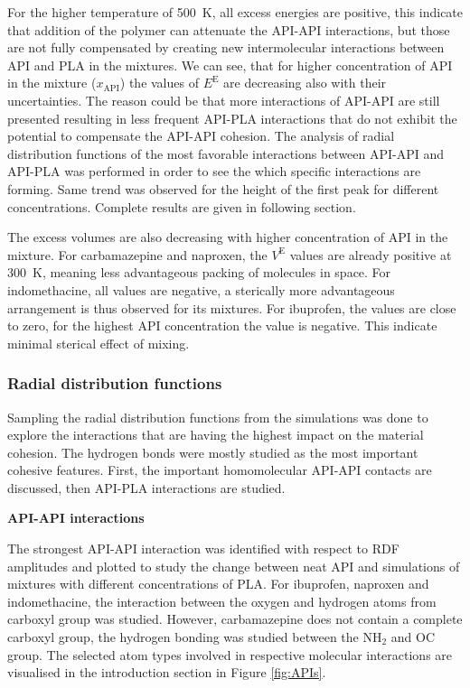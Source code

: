 \newpage
For the higher temperature of 500~K, all excess energies are positive, this indicate that addition of the polymer can attenuate the API-API interactions, but those are not fully compensated by creating new intermolecular interactions between API and PLA in the mixtures. We can see, that for higher concentration of API in the mixture ($x_{\text{API}}$) the values of $E^\text{E}$ are decreasing also with their uncertainties. The reason could be that more interactions of API-API are still presented resulting in less frequent API-PLA interactions that do not exhibit the potential to compensate the API-API cohesion. The analysis of radial distribution functions of the most favorable interactions between API-API and API-PLA was performed in order to see the which specific interactions are forming. Same trend was observed for the height of the first peak for different concentrations. Complete results are given in following section.

The excess volumes are also decreasing with higher concentration of API in the mixture. For carbamazepine and naproxen, the $V^\text{E}$ values are already positive at 300~K, meaning less advantageous packing of molecules in space. For indomethacine, all values are negative, a sterically more advantageous arrangement is thus observed for its mixtures. For ibuprofen, the values are close to zero, for the highest API concentration the value is negative. This indicate minimal sterical effect of mixing. 



\newpage
\subsubsection{Radial distribution functions}

Sampling the radial distribution functions from the simulations was done to explore the interactions that are having the highest impact on the material cohesion. The hydrogen bonds were mostly studied as the most important cohesive features. First, the important homomolecular API-API contacts are discussed, then API-PLA interactions are studied.


\textbf{API-API interactions}

\vspace{-0.2cm}
The strongest API-API interaction was identified with respect to RDF amplitudes and plotted to study the change between neat API and simulations of mixtures with different concentrations of PLA. For ibuprofen, naproxen and indomethacine, the interaction between the oxygen and hydrogen atoms from carboxyl group was studied. However, carbamazepine does not contain a complete carboxyl group, the hydrogen bonding was studied between the N$\text{H}_\text{2}$ and OC group. The selected atom types involved in respective molecular interactions are visualised in the introduction section in Figure \ref{fig:APIs}. 

